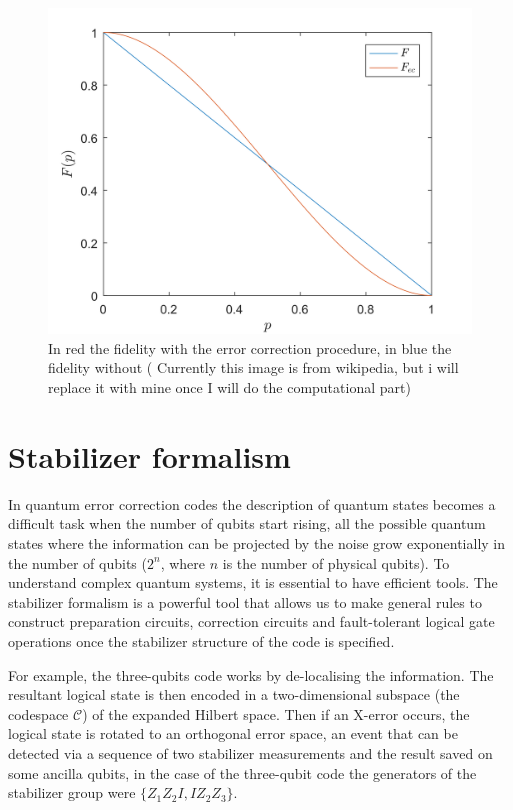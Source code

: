 \begin{figure}[h!]
    \centering
    \includegraphics[scale=0.07]{Mainmatter/images/fidelity.png}
    \caption{In red the fidelity with the error correction procedure, in blue the fidelity without ( Currently this image is from wikipedia, but i will replace it with mine once I will do the computational part)}
    \label{fig:fidelity3qbit}
\end{figure}

\section{Stabilizer formalism}
In quantum error correction codes the description of quantum states becomes a difficult task when the number of qubits start rising, all the possible quantum states where the information can be projected by the noise grow exponentially in the number of qubits ($2^n$, where $n$ is the number of physical qubits). To understand complex quantum systems, it is essential to have efficient tools. The stabilizer formalism is a powerful tool that allows us to make general rules to construct preparation circuits, correction circuits and fault-tolerant logical gate operations once the stabilizer structure of the code is specified.


For example, the three-qubits code works by de-localising the information. The resultant logical state is then encoded in a two-dimensional subspace (the codespace $\mathcal{C}$) of the expanded Hilbert space. Then if an X-error occurs, the logical state is rotated to an orthogonal error space, an event that can be detected via a sequence of two stabilizer measurements and the result saved on some ancilla qubits, in the case of the three-qubit code the generators of the stabilizer group were $\{Z_1 Z_2 I, I Z_2 Z_3 \}$. 


